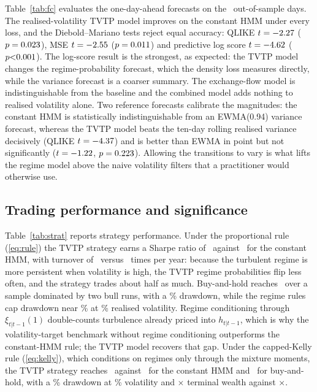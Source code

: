 \documentclass[11pt,a4paper]{article}
\begin{document}
Table~\ref{tab:fc} evaluates the one-day-ahead forecasts on the \NOOS\ out-of-sample days. The realised-volatility TVTP model improves on the constant HMM under every loss, and the Diebold--Mariano tests reject equal accuracy: QLIKE $t=-2.27$ ($p=0.023$), MSE $t=-2.55$ ($p=0.011$) and predictive log score $t=-4.62$ ($p\DMlsP$). The log-score result is the strongest, as expected: the TVTP model changes the regime-probability forecast, which the density loss measures directly, while the variance forecast is a coarser summary. The exchange-flow model is indistinguishable from the baseline and the combined model adds nothing to realised volatility alone. Two reference forecasts calibrate the magnitudes: the constant HMM is statistically indistinguishable from an EWMA(0.94) variance forecast, whereas the TVTP model beats the ten-day rolling realised variance decisively (QLIKE $t=-4.37$) and is better than EWMA in point but not significantly ($t=-1.22$, $p=0.223$). Allowing the transitions to vary is what lifts the regime model above the naive volatility filters that a practitioner would otherwise use.

\subsection{Trading performance and significance}



Table~\ref{tab:strat} reports strategy performance. Under the proportional rule (\ref{eq:rule}) the TVTP strategy earns a Sharpe ratio of \SRtvtp\ against \SRhmm\ for the constant HMM, with turnover of \TOtvtp\ versus \TOhmm\ times per year: because the turbulent regime is more persistent when volatility is high, the TVTP regime probabilities flip less often, and the strategy trades about half as much. Buy-and-hold reaches \SRbh\ over a sample dominated by two bull runs, with a \MDDbh\% drawdown, while the regime rules cap drawdown near \MDDtvtp\% at \VolTvtp\% realised volatility. Regime conditioning through $\xi_{t|t-1}(1)$ double-counts turbulence already priced into $h_{t|t-1}$, which is why the volatility-target benchmark without regime conditioning outperforms the constant-HMM rule; the TVTP model recovers that gap. Under the capped-Kelly rule (\ref{eq:kelly}), which conditions on regimes only through the mixture moments, the TVTP strategy reaches \SRtvtpK\ against \SRhmmK\ for the constant HMM and \SRbh\ for buy-and-hold, with a \MDDtvtpK\% drawdown at \VolTvtpK\% volatility and \WealthTvtpK$\times$ terminal wealth against \WealthBH$\times$.
\end{document}
